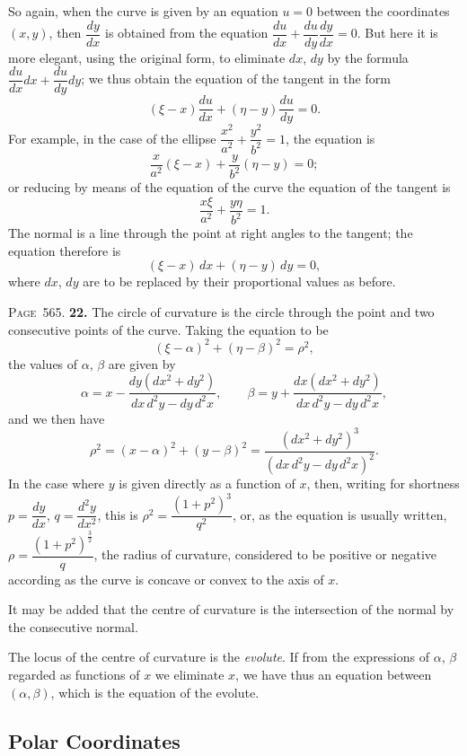 \documentclass[11pt,a4paper]{article}
\theoremstyle{definition}
\begin{document}
So again, when the curve is given by an equation $u=0$ between the coordinates $(x,y)$, then $\dfrac{dy}{dx}$ is obtained from the equation $\dfrac{du}{dx}+\dfrac{du}{dy}\dfrac{dy}{dx}=0$. But here it is more elegant, using the original form, to eliminate $dx$, $dy$ by the formula $\dfrac{du}{dx}dx+\dfrac{du}{dy}dy$; we thus obtain the equation of the tangent in the form
\[
(\xi-x)\frac{du}{dx}+(\eta-y)\frac{du}{dy}=0.
\]
For example, in the case of the ellipse $\dfrac{x^2}{a^2}+\dfrac{y^2}{b^2}=1$, the equation is
\[
\frac{x}{a^2}(\xi-x)+\frac{y}{b^2}(\eta-y)=0;
\]
or reducing by means of the equation of the curve the equation of the tangent is
\[
\frac{x\xi}{a^2}+\frac{y\eta}{b^2}=1.
\]
The normal is a line through the point at right angles to the tangent; the equation therefore is
\[
(\xi-x)\,dx+(\eta-y)\,dy=0,
\]
where $dx$, $dy$ are to be replaced by their proportional values as before.

\newpage
\noindent\textsc{Page~565.} \textbf{22.} The circle of curvature is the circle through the point and two consecutive points of the curve. Taking the equation to be
\[
(\xi-\alpha)^2+(\eta-\beta)^2=\rho^2,
\]
the values of $\alpha$, $\beta$ are given by
\[
\alpha=x-\frac{dy(d\!x^2+dy^2)}{dx\,d^2y-dy\,d^2x},\qquad
\beta=y+\frac{dx(d\!x^2+dy^2)}{dx\,d^2y-dy\,d^2x},
\]
and we then have
\[
\rho^2=(x-\alpha)^2+(y-\beta)^2=\frac{(d\!x^2+dy^2)^3}{(dx\,d^2y-dy\,d^2x)^2}.
\]
In the case where $y$ is given directly as a function of $x$, then, writing for shortness $p=\dfrac{dy}{dx}$, $q=\dfrac{d^2y}{dx^2}$, this is $\rho^2=\dfrac{(1+p^2)^3}{q^2}$, or, as the equation is usually written, $\rho=\dfrac{(1+p^2)^{\frac32}}{q}$, the radius of curvature, considered to be positive or negative according as the curve is concave or convex to the axis of $x$.

It may be added that the centre of curvature is the intersection of the normal by the consecutive normal.

The locus of the centre of curvature is the \textit{evolute}. If from the expressions of $\alpha$, $\beta$ regarded as functions of $x$ we eliminate $x$, we have thus an equation between $(\alpha,\beta)$, which is the equation of the evolute.

\subsection*{Polar Coordinates}
\end{document}
